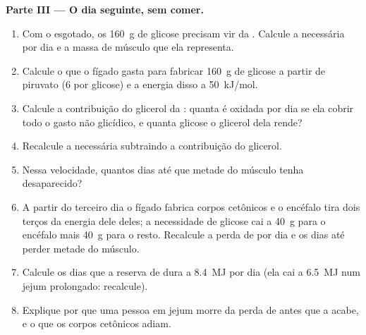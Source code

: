 \begin{problem}
\medskip
\noindent\textbf{Parte III --- O dia seguinte, sem comer.}
\begin{enumerate}[resume]
  \item Com o  esgotado, os \qty{160}{g} de glicose precisam
        vir da . Calcule a  necessária por dia e a
        massa de músculo que ela representa.
  \item Calcule o  que o fígado gasta para fabricar \qty{160}{g} de
        glicose a partir de piruvato (6  por glicose) e a energia
        disso a \qty{50}{kJ/mol}.
  \item Calcule a contribuição do glicerol da : quanta  é
        oxidada por dia se ela cobrir todo o gasto não glicídico, e
        quanta glicose o glicerol dela rende?
  \item Recalcule a  necessária subtraindo a contribuição do
        glicerol.
  \item Nessa velocidade, quantos dias até que metade do músculo tenha
        desaparecido?
  \item A partir do terceiro dia o fígado fabrica corpos cetônicos e o
        encéfalo tira dois terços da energia dele deles; a necessidade
        de glicose cai a \qty{40}{g} para o encéfalo mais \qty{40}{g}
        para o resto. Recalcule a perda de  por dia e os dias
        até perder metade do músculo.
  \item Calcule os dias que a reserva de  dura a \qty{8.4}{MJ}
        por dia (ela cai a \qty{6.5}{MJ} num jejum prolongado:
        recalcule).
  \item Explique por que uma pessoa em jejum morre da perda de 
        antes que a  acabe, e o que os corpos cetônicos adiam.
\end{enumerate}


\end{problem}
